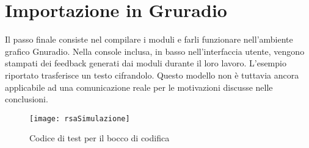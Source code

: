 \section{Importazione in Gruradio}
Il passo finale consiste nel compilare i moduli e farli funzionare nell'ambiente grafico Gnuradio. Nella console inclusa, in basso nell'interfaccia utente, vengono stampati dei feedback generati dai moduli durante il loro lavoro. L'esempio riportato trasferisce un testo cifrandolo. Questo modello non è tuttavia ancora applicabile ad una comunicazione reale per le motivazioni discusse nelle conclusioni.
\begin{figure}[h]
	\centering
	\texttt{[image: rsaSimulazione]}
	\caption{Codice di test per il bocco di codifica}
\end{figure}

\newpage
